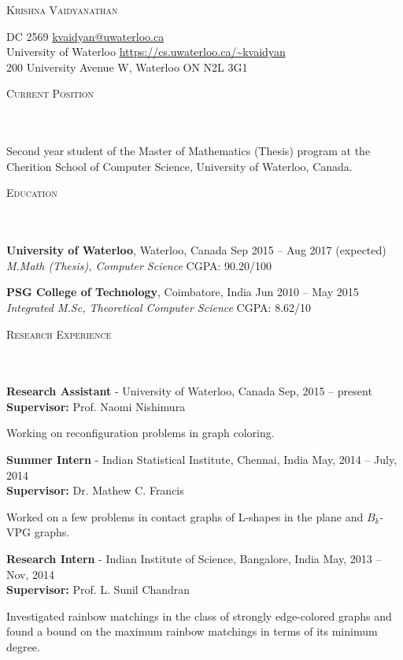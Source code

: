 \documentclass{article}
\newcommand{\header}[1]{{
\hspace*{-15pt}\vspace*{6pt} \textsc{#1}} \vspace*{-6pt} 
\lineunder
}
\newcommand{\lineunder}{
\vspace*{-8pt} \\ \hspace*{-18pt} 
\hrulefill \\
}
\newcommand{\content}{
\vspace*{2pt}%
}
\newcommand{\college}[5]{\vspace*{2pt}%
#1 \hfill #2 \\ #3 \hfill #4
\vspace*{5pt}
}
\newcommand{\employer}[4]{{
\vspace*{2pt}%
\textbf{#1} - #2 \hfill #3\\ #4 \vspace*{2pt}}
}
\renewcommand{\labelitemii}{
$\vcenter{\hbox{\tiny$\bullet$}}$\hspace*{-3pt}
}
\newenvironment{bullet-list-minor}{
\begin{list}{\labelitemii}{\setlength\leftmargin{15pt} 
\topsep 0pt \itemsep -2pt}}{\vspace*{4pt}\end{list}
}
\begin{document}
\small
\smallskip

\begin{center}
    {\large \scshape{Krishna Vaidyanathan}}
\end{center}
    DC 2569  \hfill 
    \href{mailto:kvaidyan@uwaterloo.ca}{kvaidyan@uwaterloo.ca} \\
    University of Waterloo \hfill 
    \url{https://cs.uwaterloo.ca/~kvaidyan} \\
    200 University Avenue W, Waterloo ON N2L 3G1

\vspace{15pt}
\header{Current Position}
    \content{
Second year student of the Master of Mathematics (Thesis) program at the Cherition School of Computer
Science, University of Waterloo, Canada.}


\vspace*{4pt}%
\header{Education}
    \college{\textbf{University of Waterloo}, Waterloo, Canada}{Sep 2015 -- Aug 2017 (expected)}
    {\textit{M.Math (Thesis), Computer Science}}{CGPA: 90.20/100}\\

    \college{\textbf{PSG College of Technology}, Coimbatore, India}{Jun 2010 -- May 2015}
    {\textit{Integrated M.Sc, Theoretical Computer Science}}{CGPA: 8.62/10}\\

\vspace*{4pt}%
\header{Research Experience}
\employer{Research Assistant}{University of Waterloo, Canada}{Sep, 2015 --
      present}{\textbf{Supervisor:} Prof. Naomi Nishimura}
\begin{bullet-list-minor}
\item Working on reconfiguration problems in graph coloring. 
\end{bullet-list-minor}

\employer{Summer Intern}{Indian Statistical Institute,
    Chennai, India}{May, 2014 -- July, 2014}{\textbf{Supervisor:} Dr. Mathew C. Francis}
\begin{bullet-list-minor}
\item Worked on a few problems in contact graphs of L-shapes in the plane and $B_{k}$-VPG graphs.
\end{bullet-list-minor}

\employer{Research Intern}{Indian Institute of Science, Bangalore, India}{May,
    2013 -- Nov, 2014}{\textbf{Supervisor:} Prof. L. Sunil Chandran}
\begin{bullet-list-minor}
\item Investigated rainbow matchings in the class of strongly edge-colored graphs and found a bound on the maximum rainbow matchings in terms of its minimum degree.
\end{bullet-list-minor}
\end{document}
